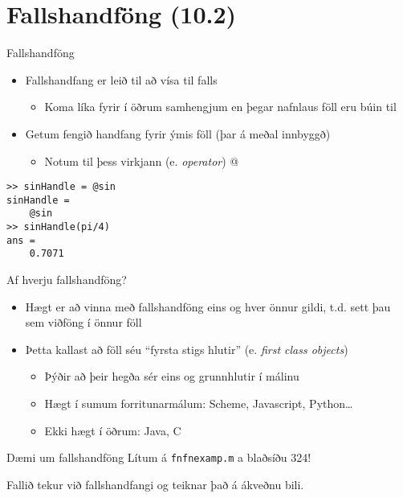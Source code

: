 \documentclass{beamer}
\begin{document}
\section{Fallshandföng (10.2)}

\begin{frame}[fragile]{Fallshandföng}
\vspace{\baselineskip}
\begin{itemize}
 \item Fallshandfang er leið til að vísa til falls
 \begin{itemize}
  \item Koma líka fyrir í öðrum samhengjum en þegar nafnlaus föll eru búin til
 \end{itemize}
 \item Getum fengið handfang fyrir ýmis föll (þar á meðal innbyggð)
 \begin{itemize}
  \item Notum til þess virkjann (e. \emph{operator}) @
 \end{itemize}
\end{itemize}
\begin{verbatim}
>> sinHandle = @sin
sinHandle = 
    @sin
>> sinHandle(pi/4)
ans =
    0.7071
\end{verbatim}
\end{frame}

\begin{frame}{Af hverju fallshandföng?}
\begin{itemize}
 \item Hægt er að vinna með fallshandföng eins og hver önnur gildi, t.d. sett þau sem viðföng í önnur föll
 \item Þetta kallast að föll séu ``fyrsta stigs hlutir'' (e. \emph{first class objects})
 \begin{itemize}
  \item Þýðir að þeir hegða sér eins og grunnhlutir í málinu
  \item Hægt í sumum forritunarmálum: Scheme, Javascript, Python\ldots
  \item Ekki hægt í öðrum: Java, C
 \end{itemize}
\end{itemize}
\end{frame}

\begin{frame}{Dæmi um fallshandföng}
Lítum á \texttt{fnfnexamp.m} a blaðsíðu 324!

Fallið tekur við fallshandfangi og teiknar það á ákveðnu bili.
\end{frame}
\end{document}
